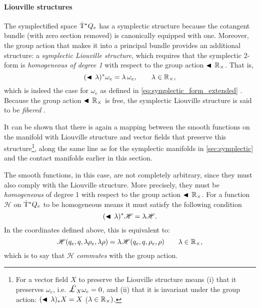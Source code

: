 \paragraph{Liouville structures} The symplectified space \(\mathrm{\dot{T}}^*Q_e\) has a symplectic structure because the cotangent bundle (with zero section removed) is canonically equipped with one. Moreover, the group action that makes it into a principal bundle provides an additional structure: a \emph{symplectic Liouville structure}, which requires that the symplectic 2-form is \emph{homogeneous of degree 1} with respect to the group action \(\blacktriangleleft\,\mathbb{R}_{\times}\). That is,
\begin{equation}
     (\blacktriangleleft\,\lambda)^* \omega_e = \lambda\,\omega_e, \qquad \lambda \in \mathbb{R}_{\times},
\end{equation}
which is indeed the case for \(\omega_e\) as defined in \cref{eq:symplectic_form_extended} \cite{Libermann1987}. Because the group action \(\blacktriangleleft\,\mathbb{R}_{\times}\) is free, the symplectic Liouville structure is said to be \emph{fibered} \cite{Libermann1987}.

It can be shown that there is again a mapping between the smooth functions on the manifold with Liouville structure and vector fields that preserve this structure\footnote
{For a vector field \(X\) to preserve the Liouville structure means (i) that it preserves \(\omega_e\), i.e. \(\lied{X}{\omega_e} = 0\), and (ii) that it is invariant under the group action: \( (\blacktriangleleft\,\lambda)_* X = X\) (\(\lambda \in \mathbb{R}_{\times})\). }, along the same line as for the symplectic manifolds in \cref{sec:symplectic} and the contact manifolds earlier in this section.

The smooth functions, in this case, are not completely arbitrary, since they must also comply with the Liouville structure. More precisely, they must be \emph{homogeneous} of degree 1 with respect to the group action \(\blacktriangleleft\,\mathbb{R}_{\times}\). For a function \(\mathscr{H}\) on \(\mathrm{\dot{T}}^*Q_e\) to be homogeneous means it must satisfy the following condition
\begin{equation}
     (\blacktriangleleft\,\lambda )^* \mathscr{H} = \lambda \mathscr{H}.
\end{equation}
In the coordinates defined above, this is equivalent to:
\begin{equation}
     \mathscr{H}(q_e, q, \lambda \rho_e, \lambda \rho) = \lambda\mathscr{H}(q_e, q, \rho_e, \rho) \qquad \lambda \in \mathbb{R}_{\times},
\end{equation}
which is to say that \(\mathscr{H}\) \emph{commutes} with the group action.

